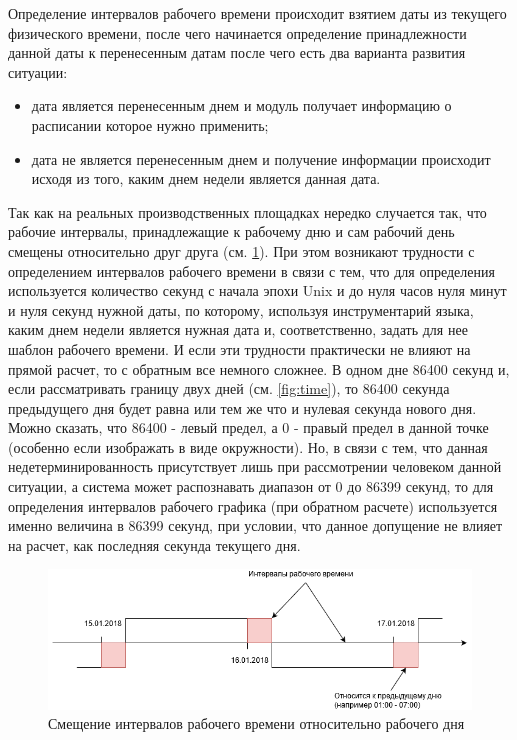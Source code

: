 \indent Определение интервалов рабочего времени происходит взятием даты из текущего физического времени, после чего начинается определение принадлежности данной даты к перенесенным датам после чего есть два варианта развития ситуации:

\begin{itemize}
	\item дата является перенесенным днем и модуль получает информацию о расписании которое нужно применить;
	\item дата не является перенесенным днем и получение информации происходит исходя из того, каким днем недели является данная дата.
\end{itemize}

\indent Так как на реальных производственных площадках нередко случается так, что рабочие интервалы, принадлежащие к рабочему дню и сам рабочий день смещены относительно друг друга (см. \ref{fig:intervals}).
При этом возникают трудности с определением интервалов рабочего времени в связи с тем, что для определения используется количество секунд с начала эпохи Unix и до нуля часов нуля минут и нуля секунд нужной даты, по которому, используя инструментарий языка, каким днем недели является нужная дата и, соответственно, задать для нее шаблон рабочего времени.
И если эти трудности практически не влияют на прямой расчет, то с обратным все немного сложнее.
В одном дне 86400 секунд и, если рассматривать границу двух дней (см. \ref{fig:time}), то 86400 секунда предыдущего дня будет равна или тем же что и нулевая секунда нового дня.
Можно сказать, что 86400 - левый предел, а 0 - правый предел в данной точке (особенно если изображать в виде окружности).
Но, в связи с тем, что данная недетерминированность присутствует лишь при рассмотрении человеком данной ситуации, а система может распознавать диапазон от 0 до 86399 секунд, то для определения интервалов рабочего графика (при обратном расчете) используется именно величина в 86399 секунд, при условии, что данное допущение не влияет на расчет, как последняя секунда текущего дня.

\begin{figure}[h]
	\includegraphics[width=\linewidth]{pics/scheduleIntervals.png}
	\caption{Смещение интервалов рабочего времени относительно рабочего дня}
	\label{fig:intervals}
	\centering
\end{figure}


